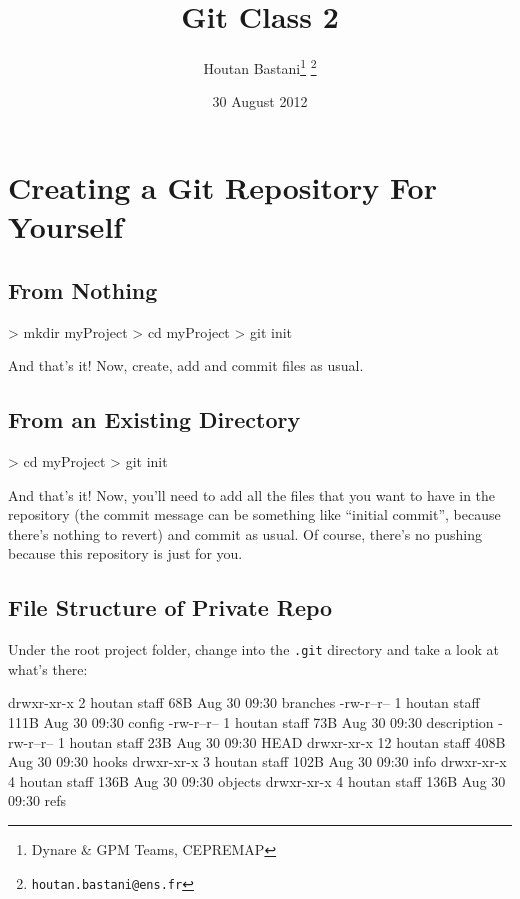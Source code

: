 \documentclass[10pt,letterpaper]{article}
\begin{document}
\title{Git Class 2}
\author{Houtan Bastani\thanks{Dynare \& GPM Teams, CEPREMAP} \thanks{\texttt{houtan.bastani@ens.fr}}}
\date{30 August 2012}
\maketitle

\section{Creating a Git Repository For Yourself}

\subsection{From Nothing}

\begin{code}
> mkdir myProject
> cd myProject
> git init
\end{code}
\noindent And that's it! Now, create, add and commit files as usual.

\subsection{From an Existing Directory}

\begin{code}
> cd myProject
> git init
\end{code}
\noindent And that's it! Now, you'll need to add all the files that you want to have in the repository (the commit message can be something like ``initial commit'', because there's nothing to revert) and commit as usual. Of course, there's no pushing because this repository is just for you.

\subsection{File Structure of Private Repo}

Under the root project folder, change into the \texttt{.git} directory and take a look at what's there:
\begin{code}
drwxr-xr-x   2 houtan  staff    68B Aug 30 09:30 branches
-rw-r--r--   1 houtan  staff   111B Aug 30 09:30 config
-rw-r--r--   1 houtan  staff    73B Aug 30 09:30 description
-rw-r--r--   1 houtan  staff    23B Aug 30 09:30 HEAD
drwxr-xr-x  12 houtan  staff   408B Aug 30 09:30 hooks
drwxr-xr-x   3 houtan  staff   102B Aug 30 09:30 info
drwxr-xr-x   4 houtan  staff   136B Aug 30 09:30 objects
drwxr-xr-x   4 houtan  staff   136B Aug 30 09:30 refs
\end{code}
\end{document}
